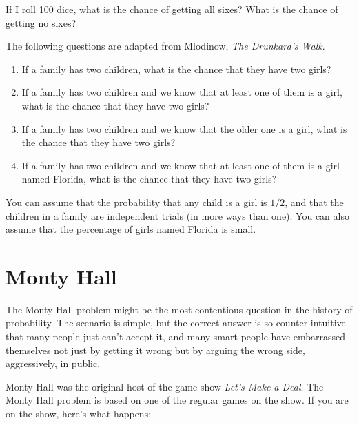 \documentclass[12pt]{book}
\begin{document}
\begin{exercise}
If I roll 100 dice, what is the chance of getting all sixes?
What is the chance of getting no sixes?
\end{exercise}

\begin{exercise}
The following questions are adapted from Mlodinow, {\em The Drunkard's
  Walk}.


\begin{enumerate}

\item If a family has two children, what is the chance that they
  have two girls?

\item If a family has two children and we know that at least one of
  them is a girl, what is the chance that they have two girls?

\item If a family has two children and we know that the older one is a
  girl, what is the chance that they have two girls?

\item If a family has two children and we know that at least one of
  them is a girl named Florida, what is the chance that they have
  two girls?

\end{enumerate}

You can assume that the probability that any child is a girl is $1/2$,
and that the children in a family are independent trials (in more ways
than one).  You can also assume that the percentage of girls named
Florida is small.

\end{exercise}


\section{Monty Hall}


The Monty Hall problem might be the most contentious question in
the history of probability.  The scenario is simple, but the correct
answer is so counter-intuitive that many people just can't accept
it, and many smart people have embarrassed themselves not just by
getting it wrong but by arguing the wrong side, aggressively,
in public.

Monty Hall was the original host of the game show {\em Let's Make a
Deal}.  The Monty Hall problem is based on one of the regular
games on the show.  If you are on the show, here's what happens:
\end{document}
